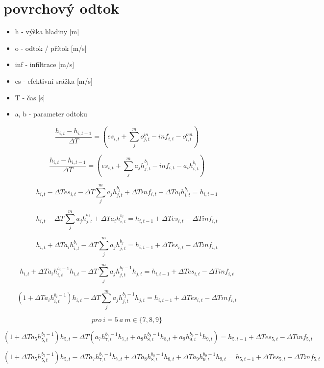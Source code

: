 \documentclass{article}
\begin{document}
\section*{povrchový odtok}

\begin{itemize}
\item h - výška hladiny [m]
\item o - odtok / přítok [m/s]
\item inf - infiltrace [m/s]
\item es - efektivní srážka [m/s]
\item T - čas [s]
\item a, b - parameter odtoku
\end{itemize}

$$
  \frac{h_{i,t} - h_{i,t-1} }{\Delta T} =  \left(es_{i,t} + \sum_j^m o^{in}_{j,t} - inf_{i,t} - o^{out}_{i,t}\right)
$$


$$
  \frac{h_{i,t} - h_{i,t-1} }{\Delta T} =  \left(es_{i,t} + \sum_j^m a_jh^{b_{j}}_{j,t} - inf_{i,t} - a_ih^{b_{i}}_{i,t}\right)
$$





$$
  h_{i,t} - \Delta T es_{i,t} - \Delta T \sum_j^m a_jh^{b_{j}}_{j,t} + \Delta T inf_{i,t} + \Delta T a_ih^{b_{i}}_{i,t} = h_{i,t-1} 
$$


$$
  h_{i,t} - \Delta T \sum_j^m a_jh^{b_{j}}_{j,t} + \Delta T a_ih^{b_{i}}_{i,t} = h_{i,t-1} + \Delta T es_{i,t} - \Delta T inf_{i,t}
$$



$$
  h_{i,t} + \Delta T a_ih^{b_{i}}_{i,t} - \Delta T \sum_j^m a_jh^{b_{j}}_{j,t}  = h_{i,t-1} + \Delta T es_{i,t} - \Delta T inf_{i,t}
$$

$$
  h_{i,t} + \Delta T a_ih^{b_{i}-1}_{i,t} h_{i,t} - \Delta T \sum_j^m a_jh^{b_{j}-1}_{j,t} h_{j,t} = h_{i,t-1} + \Delta T es_{i,t} - \Delta T inf_{i,t}
$$


$$
  (1+\Delta T a_ih^{b_{i}-1}_{i,t})h_{i,t} - \Delta T \sum_j^m a_jh^{b_{j}-1}_{j,t} h_{j,t} = h_{i,t-1} + \Delta T es_{i,t} - \Delta T inf_{i,t}
$$

$$
pro\ i=5\ a\ m\in\{7,8,9\}
$$



$$
  (1+\Delta T a_5h^{b_{5}-1}_{5,t})h_{5,t} - \Delta T ( a_7h^{b_{7}-1}_{7,t} h_{7,t} + a_8h^{b_{8}-1}_{8,t} h_{8,t} + a_9 h^{b_{9}-1}_{9,t} h_{9,t} ) = h_{5,t-1} + \Delta T es_{5,t} - \Delta T inf_{5,t}
$$



$$
  (1+\Delta T a_5h^{b_{5}-1}_{5,t})h_{5,t} - \Delta T a_7h^{b_{7}-1}_{7,t} h_{7,t} + \Delta T a_8h^{b_{8}-1}_{8,t} h_{8,t} + \Delta T a_9 h^{b_{9}-1}_{9,t} h_{9,t}  = h_{5,t-1} + \Delta T es_{5,t} - \Delta T inf_{5,t}
$$
\end{document}
